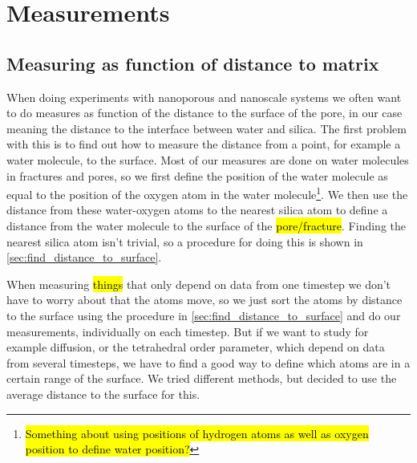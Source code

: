 \chapter{Measurements}
%
%
\section{Measuring as function of distance to matrix\label{sec:measuring_distance_to_matrix}}

When doing experiments with nanoporous and nanoscale systems we often want to do measures as function of the distance to the surface of the pore, in our case meaning the distance to the interface between water and silica. The first problem with this is to find out how to measure the distance from a point, for example a water molecule, to the surface. Most of our measures are done on water molecules in fractures and pores, so we first define the position of the water molecule as equal to the position of the oxygen atom in the water molecule\footnote{\hl{Something about using positions of hydrogen atoms as well as oxygen position to define water position?}}. We then use the distance from these water-oxygen atoms to the nearest silica atom to define a distance from the water molecule to the surface of the \hl{pore/fracture}. Finding the nearest silica atom isn't trivial, so a procedure for doing this is shown in \cref{sec:find_distance_to_surface}.

When measuring \hl{things} that only depend on data from one timestep we don't have to worry about that the atoms move, so we just sort the atoms by distance to the surface using the procedure in \cref{sec:find_distance_to_surface} and do our measurements, individually on each timestep. But if we want to study for example diffusion, or the tetrahedral order parameter, which depend on data from several timesteps, we have to find a good way to define which atoms are in a certain range of the surface. We tried different methods, but decided to use the average distance to the surface for this.

